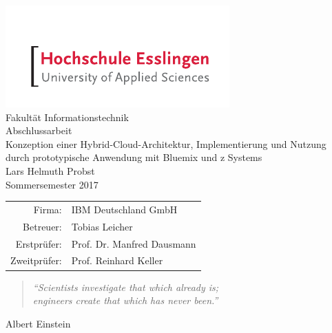 





\begin{titlepage}
\begin{center}
\includegraphics[scale=2.5]{images/he_logo.pdf}\\
\vspace{1cm} Fakultät Informationstechnik\\
\vspace{1.5cm} \Large Abschlussarbeit\\
\vspace{1.5cm} \Huge Konzeption einer Hybrid-Cloud-Architektur, Implementierung und Nutzung durch prototypische Anwendung mit Bluemix und z Systems\\
\vspace{1.5cm} \Large Lars Helmuth Probst\\\normalsize
\vspace{0.5cm} Sommersemester 2017\\\normalsize
\vfill{}
\begin{tabular}{rl}
Firma: & IBM Deutschland GmbH\\[0.5cm]
Betreuer: & Tobias Leicher\\[0.5cm]
Erstprüfer: & Prof. Dr. Manfred Dausmann\\[0.5cm]
Zweitprüfer: & Prof. Reinhard Keller\\
\end{tabular}
\end{center}
\end{titlepage}

\thispagestyle{empty}
\vspace*{2cm}
\begin{center}
\begin{minipage}{12cm}
\begin{center}
\end{center}
\end{minipage}
\vfill{}
\begin{minipage}{10cm}
\begin{quote}
\textit{"`Scientists investigate that which already is;\\ engineers create that which has never been."'}
\end{quote}
\hfill Albert Einstein
\end{minipage}
\end{center}

